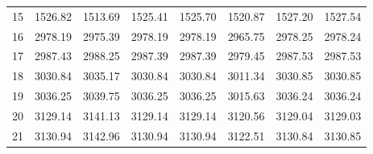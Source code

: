 \documentclass[10pt,oneside]{article}
\begin{document}
\begin{table}[h!]
\begin{tabular}{cccccccc}
15 &   1526.82 & 1513.69 & 1525.41 &    1525.70 &      1520.87 & 1527.20 &   1527.54 \\
16 &   2978.19 & 2975.39 & 2978.19 &    2978.19 &      2965.75 & 2978.25 &   2978.24 \\
17 &   2987.43 & 2988.25 & 2987.39 &    2987.39 &      2979.45 & 2987.53 &   2987.53 \\
18 &   3030.84 & 3035.17 & 3030.84 &    3030.84 &      3011.34 & 3030.85 &   3030.85 \\
19 &   3036.25 & 3039.75 & 3036.25 &    3036.25 &      3015.63 & 3036.24 &   3036.24 \\
20 &   3129.14 & 3141.13 & 3129.14 &    3129.14 &      3120.56 & 3129.04 &   3129.03 \\
21 &   3130.94 & 3142.96 & 3130.94 &    3130.94 &      3122.51 & 3130.84 &   3130.85 \\
\bottomrule
\end{tabular}
\end{table}
\end{document}
